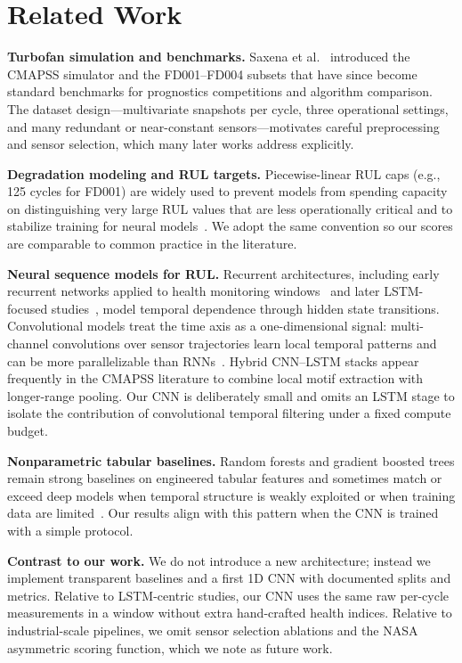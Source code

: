 \documentclass[11pt]{article}
\begin{document}
\section{Related Work}

\textbf{Turbofan simulation and benchmarks.} Saxena et al.~\cite{saxena2008damage} introduced the CMAPSS simulator and the FD001--FD004 subsets that have since become standard benchmarks for prognostics competitions and algorithm comparison. The dataset design---multivariate snapshots per cycle, three operational settings, and many redundant or near-constant sensors---motivates careful preprocessing and sensor selection, which many later works address explicitly.

\textbf{Degradation modeling and RUL targets.} Piecewise-linear RUL caps (e.g., 125 cycles for FD001) are widely used to prevent models from spending capacity on distinguishing very large RUL values that are less operationally critical and to stabilize training for neural models~\cite{li2018remaining}. We adopt the same convention so our scores are comparable to common practice in the literature.

\textbf{Neural sequence models for RUL.} Recurrent architectures, including early recurrent networks applied to health monitoring windows~\cite{heimes2008recurrent} and later LSTM-focused studies~\cite{zheng2017long}, model temporal dependence through hidden state transitions. Convolutional models treat the time axis as a one-dimensional signal: multi-channel convolutions over sensor trajectories learn local temporal patterns and can be more parallelizable than RNNs~\cite{babu2016deep}. Hybrid CNN--LSTM stacks appear frequently in the CMAPSS literature to combine local motif extraction with longer-range pooling. Our CNN is deliberately small and omits an LSTM stage to isolate the contribution of convolutional temporal filtering under a fixed compute budget.

\textbf{Nonparametric tabular baselines.} Random forests and gradient boosted trees remain strong baselines on engineered tabular features and sometimes match or exceed deep models when temporal structure is weakly exploited or when training data are limited~\cite{breiman2001random}. Our results align with this pattern when the CNN is trained with a simple protocol.

\textbf{Contrast to our work.} We do not introduce a new architecture; instead we implement transparent baselines and a first 1D CNN with documented splits and metrics. Relative to LSTM-centric studies, our CNN uses the same raw per-cycle measurements in a window without extra hand-crafted health indices. Relative to industrial-scale pipelines, we omit sensor selection ablations and the NASA asymmetric scoring function, which we note as future work.
\end{document}
